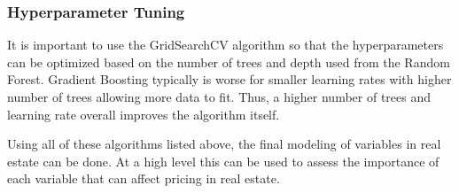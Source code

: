 \documentclass[12pt]{article}
\begin{document}
\subsubsection{Hyperparameter Tuning}
It is important to use the GridSearchCV algorithm so that the hyperparameters can be optimized based on the number of trees and depth used from the Random Forest.
Gradient Boosting typically is worse for smaller learning rates with higher number of trees allowing more data to fit.
Thus, a higher number of trees and learning rate overall improves the algorithm itself.
\vspace{1em}

Using all of these algorithms listed above, the final modeling of variables in real estate can be done.
At a high level this can be used to assess the importance of each variable that can affect pricing in real estate.
\end{document}
